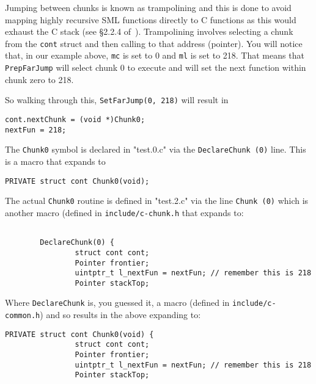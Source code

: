 Jumping between chunks is known as trampolining and this is done to avoid mapping highly recursive SML functions directly to C functions as this would exhaust the C stack (see \S2.2.4 of~\cite{leibig:mlton-llvm-backend}). Trampolining involves selecting a chunk from the \texttt{cont} struct and then calling to that address (pointer). You will notice that, in our example above, \texttt{mc} is set to 0 and \texttt{ml} is set to 218. That means that \texttt{PrepFarJump} will select chunk 0 to execute and will set the next function within chunk zero to 218. 

So walking through this, \texttt{SetFarJump(0, 218)} will result in 

\begin{minipage}{\linewidth}
\lstset{language=C}\begin{lstlisting}
cont.nextChunk = (void *)Chunk0;
nextFun = 218;
\end{lstlisting}
\end{minipage}

The \texttt{Chunk0} symbol is declared in "test.0.c" via the \texttt{DeclareChunk (0)} line. This is a macro that expands to 

\begin{minipage}{\linewidth}
\lstset{language=C}\begin{lstlisting}
PRIVATE struct cont Chunk0(void);
\end{lstlisting}
\end{minipage}

The actual \texttt{Chunk0} routine is defined in "test.2.c" via the line \texttt{Chunk (0)} which is another macro (defined in \texttt{include/c-chunk.h} that expands to:

\begin{minipage}{\linewidth}
\lstset{language=C}\begin{lstlisting}
	
        DeclareChunk(0) {
                struct cont cont;
                Pointer frontier;
                uintptr_t l_nextFun = nextFun; // remember this is 218
                Pointer stackTop;
\end{lstlisting}
\end{minipage}

Where \texttt{DeclareChunk} is, you guessed it, a macro (defined in \texttt{include/c-common.h}) and so results in the above expanding to:


\begin{minipage}{\linewidth}
\lstset{language=C}\begin{lstlisting}
PRIVATE struct cont Chunk0(void) {
                struct cont cont;
                Pointer frontier;
                uintptr_t l_nextFun = nextFun; // remember this is 218
                Pointer stackTop;
\end{lstlisting}
\renewcommand{\lstlistingname}{Code}
\end{minipage}

